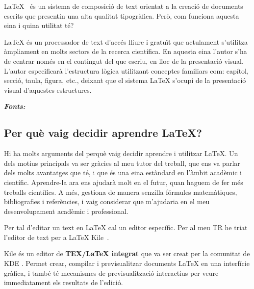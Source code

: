 LaTeX~\cite{LaTeX} és un sistema de composició de text orientat a la creació de documents escrits que presentin una alta qualitat tipogràfica. Però, com funciona aquesta eina i quina utilitat té?

LaTeX és un processador de text d’accés lliure i gratuït que actulament s’utilitza àmpliament en molts sectors de la recerca científica. En aquesta eina l’autor s’ha de centrar només en el contingut del que escriu, en lloc de la presentació visual. L’autor especificarà l’estructura lògica utilitzant conceptes familiars com: capítol, secció, taula, figura, etc., deixant que el sistema LaTeX s’ocupi de la presentació visual d’aquestes estructures.

\textit{\textbf{Fonts:}} \cite{CH}
\subsection*{Per què vaig decidir aprendre LaTeX?}
Hi ha molts arguments del perquè vaig decidir aprendre i utilitzar LaTeX. Un dels motius principals va ser gràcies al meu tutor del treball, que ens va parlar dels molts avantatges que té, i que és una eina estàndard en l’àmbit acadèmic i científic. Aprendre-la ara ens ajudarà molt en el futur, quan haguem de fer més treballs científics. A més, gestiona de manera senzilla fórmules matemàtiques, bibliografies i referències, i vaig considerar que m’ajudaria en el meu desenvolupament acadèmic i professional.

Per tal d'editar un text en LaTeX cal un editor específic. Per al meu TR he triat l'editor de text per a LaTeX Kile~\cite{kile}.



Kile és un editor de \textbf{TEX/LaTeX integrat} que va ser creat per la comunitat de KDE \cite{kile}. Permet crear, compilar i previsualitzar documents LaTeX en una interfície gràfica, i també té mecanismes de previsualització interactius per veure immediatament els resultats de l’edició.

